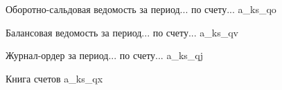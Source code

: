 \begin{figure}[!htb]
    \centering
    \caption{Оборотно-сальдовая ведомость за период... по счету... \gpiFIO\/a\_ks\_qo}
\end{figure}

\begin{figure}[!htb]
    \centering
    \caption{Балансовая ведомость за период... по счету... \gpiFIO\/a\_ks\_qv}
\end{figure}

\begin{figure}[!htb]
    \centering
    \caption{Журнал-ордер за период... по счету... \gpiFIO\/a\_ks\_qj}
\end{figure}

\begin{figure}[!htb]
    \centering
    \caption{Книга счетов  \gpiFIO\/a\_ks\_qx}
\end{figure}
